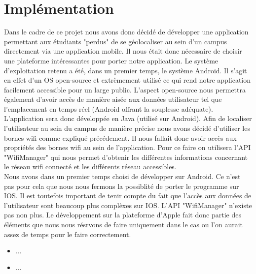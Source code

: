 \documentclass[a4paper,11pt]{article}
\begin{document}
\section{Implémentation}
  Dans le cadre de ce projet nous avons donc décidé de développer une application permettant aux étudiants "perdus" de se géolocaliser au sein d'un campus directement via une application mobile. Il nous était donc nécessaire de choisir une plateforme intéressantes pour porter notre application. Le système d'exploitation retenu a été, dans un premier temps, le système Android. Il s'agit en effet d'un OS open-source et extrèmement utilisé ce qui rend notre application facilement accessible pour un large public. L'aspect open-source nous permettra également d'avoir accès de manière aisée aux données utilisateur tel que l'emplacement en temps réel (Android offrant la souplesse adéquate).\\
L'application sera donc développée en Java (utilisé sur Android). Afin de localiser l'utilisateur au sein du campus de manière précise nous avons décidé d'utiliser les bornes wifi comme expliqué précédement. Il nous fallait donc avoir accès aux propriétés des bornes wifi au sein de l'application. Pour ce faire on utilisera l'API "WifiManager" qui nous permet d'obtenir les différentes informations concernant le réseau wifi connecté et les différents réseau accessibles.\\
Nous avons dans un premier temps choisi de développer sur Android. Ce n'est pas pour cela que nous nous fermons la possiblité de porter le programme sur IOS. Il est toutefois important de tenir compte du fait que l'accès aux données de l'utilisateur sont beaucoup plus complèxes sur IOS. L'API "WifiManager" n'existe pas non plus. Le développement sur la plateforme d'Apple fait donc partie des éléments que nous nous résrvons de faire uniquement dans le cas ou l'on aurait assez de temps pour le faire correctement.
    
    \begin{center}
      \begin{tcolorbox}[title=Avantages :]
        \begin{itemize}
          \item ...
        \end{itemize}
      \end{tcolorbox}
      \begin{tcolorbox}[title=Désavantages :]
        \begin{itemize}
          \item ...
        \end{itemize}
      \end{tcolorbox}
    \end{center}
\end{document}
